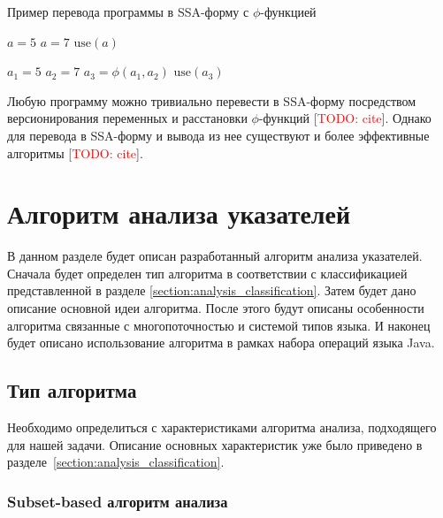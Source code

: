 \documentclass[14pt,titlepage]{extarticle}
\let\oldphi\phi
\renewcommand{\phi}{\ensuremath{\oldphi}}
\newcommand{\todo}[1]{\textcolor{red}{\eng{TODO}: #1}}
\newcommand{\todocite}{[\todo{cite}]}
\newcommand{\eng}[1]{{\English#1}}
\let\oldsection\section
\renewcommand{\section}{\newpage\oldsection}
\begin{document}
    \begin{algorithm}
      \caption{Пример перевода программы в SSA-форму с \phi-функцией}
      \label{code:ssa_with_phi}
      \begin{multicols*}{2}
        \begin{algorithmic}[1]
          \IF{\ldots}
            \STATE $a = 5$
          \ELSE
            \STATE $a = 7$
          \ENDIF
          \STATE $\textrm{use}(a)$
        \end{algorithmic}
        \columnbreak
        \begin{algorithmic}[1]
          \IF{\ldots}
            \STATE $a_1 = 5$
          \ELSE
            \STATE $a_2 = 7$
          \ENDIF
          \STATE $a_3 = \phi(a_1, a_2)$
          \STATE $\textrm{use}(a_3)$
        \end{algorithmic}
      \end{multicols*}
    \end{algorithm}

    Любую программу можно тривиально перевести в SSA-форму посредством
    версионирования переменных и расстановки \phi-функций \todocite.
    Однако для перевода в SSA-форму и вывода из нее существуют и более
    эффективные алгоритмы \cite{ssa} \todocite.

  \section{Алгоритм анализа указателей}
    \label{section:algorithm}

    В данном разделе будет описан разработанный алгоритм анализа указателей.
    Сначала будет определен тип алгоритма в соответствии с классификацией
    представленной в разделе \ref{section:analysis_classification}.
    Затем будет дано описание основной идеи алгоритма.
    После этого будут описаны особенности алгоритма связанные с
    многопоточностью и системой типов языка.
    И наконец будет описано использование алгоритма в рамках набора операций
    языка Java.

    \subsection{Тип алгоритма}

      Необходимо определиться с характеристиками алгоритма анализа,
      подходящего для нашей задачи. Описание основных характеристик уже было
      приведено в разделе~\ref{section:analysis_classification}.

      \subsubsection{\eng{Subset-based} алгоритм анализа}
\end{document}
